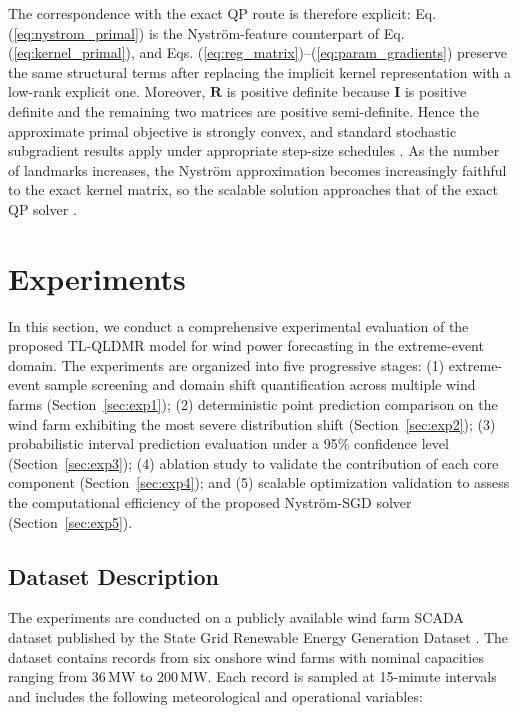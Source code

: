 \documentclass[a4paper]{cas-sc}
\begin{document}
The correspondence with the exact QP route is therefore explicit: Eq. (\ref{eq:nystrom_primal}) is the Nystr\"{o}m-feature counterpart of Eq. (\ref{eq:kernel_primal}), and Eqs. (\ref{eq:reg_matrix})--(\ref{eq:param_gradients}) preserve the same structural terms after replacing the implicit kernel representation with a low-rank explicit one. Moreover, $\boldsymbol{R}$ is positive definite because $\boldsymbol{I}$ is positive definite and the remaining two matrices are positive semi-definite. Hence the approximate primal objective is strongly convex, and standard stochastic subgradient results apply under appropriate step-size schedules \citep{bottou2018optimization}. As the number of landmarks increases, the Nystr\"{o}m approximation becomes increasingly faithful to the exact kernel matrix, so the scalable solution approaches that of the exact QP solver \citep{kumar2012sampling, zhang2010clustered}.


\section{Experiments}\label{Experiments}

In this section, we conduct a comprehensive experimental evaluation of the proposed TL-QLDMR model for wind power forecasting in the extreme-event domain. The experiments are organized into five progressive stages: (1) extreme-event sample screening and domain shift quantification across multiple wind farms (Section~\ref{sec:exp1}); (2) deterministic point prediction comparison on the wind farm exhibiting the most severe distribution shift (Section~\ref{sec:exp2}); (3) probabilistic interval prediction evaluation under a 95\% confidence level (Section~\ref{sec:exp3}); (4) ablation study to validate the contribution of each core component (Section~\ref{sec:exp4}); and (5) scalable optimization validation to assess the computational efficiency of the proposed Nystr\"{o}m-SGD solver (Section~\ref{sec:exp5}).

\subsection{Dataset Description}\label{sec:data}

The experiments are conducted on a publicly available wind farm SCADA dataset published by the State Grid Renewable Energy Generation Dataset \citep{s41597-022-01696-6}. The dataset contains records from six onshore wind farms with nominal capacities ranging from 36\,MW to 200\,MW. Each record is sampled at 15-minute intervals and includes the following meteorological and operational variables:
\end{document}
